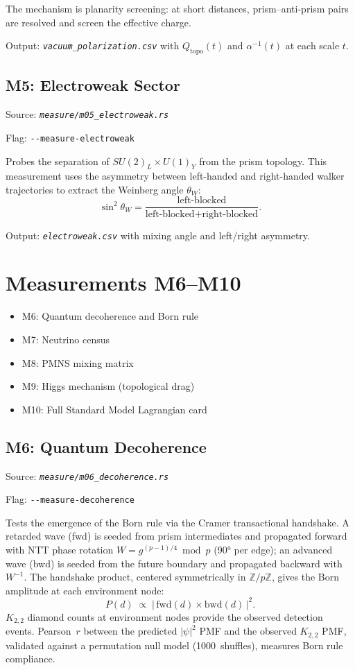 \documentclass[11pt, a4paper, openany]{book}
\newcommand{\flag}[1]{\texttt{-{}-#1}}
\newcommand{\file}[1]{\texttt{\itshape #1}}
\newenvironment{introduction}[1][Chapter Overview]{%
  \begin{tcolorbox}[
    enhanced,colback=structure!5,colframe=structure,
    colbacktitle=structure,coltitle=white,
    fonttitle=\small\bfseries,title={#1},
    arc=2pt,boxrule=0.7pt,
    left=8pt,right=8pt,top=6pt,bottom=6pt,
    before skip=12pt,after skip=12pt
  ]\itshape\begin{itemize}[leftmargin=*,itemsep=2pt,parsep=0pt]
}{%
  \end{itemize}\end{tcolorbox}
}
\begin{document}
The mechanism is planarity screening: at short distances, prism--anti-prism pairs
are resolved and screen the effective charge.

Output: \file{vacuum\_polarization.csv} with $Q_{\text{topo}}(t)$ and
$\alpha^{-1}(t)$ at each scale $t$.

\section{M5: Electroweak Sector}

Source: \file{measure/m05\_electroweak.rs}

Flag: \flag{measure-electroweak}

Probes the separation of $SU(2)_L \times U(1)_Y$ from the prism topology.
This measurement uses the asymmetry between left-handed and right-handed walker
trajectories to extract the Weinberg angle $\theta_W$:
\[
  \sin^2\theta_W = \frac{\text{left-blocked}}{\text{left-blocked} +
  \text{right-blocked}}.
\]

Output: \file{electroweak.csv} with mixing angle and left/right asymmetry.


\chapter{Measurements M6--M10}

\begin{introduction}
  \item M6: Quantum decoherence and Born rule
  \item M7: Neutrino census
  \item M8: PMNS mixing matrix
  \item M9: Higgs mechanism (topological drag)
  \item M10: Full Standard Model Lagrangian card
\end{introduction}

\section{M6: Quantum Decoherence}

Source: \file{measure/m06\_decoherence.rs}

Flag: \flag{measure-decoherence}

Tests the emergence of the Born rule via the Cramer transactional handshake.
A retarded wave (fwd) is seeded from prism intermediates and propagated forward
with NTT phase rotation $W = g^{(p-1)/4} \bmod p$ (90° per edge); an advanced
wave (bwd) is seeded from the future boundary and propagated backward with
$W^{-1}$.  The handshake product, centered symmetrically in $\mathbb{Z}/p\mathbb{Z}$,
gives the Born amplitude at each environment node:
\[
  P(d) \;\propto\; \bigl|\,\text{fwd}(d) \times \text{bwd}(d)\,\bigr|^2.
\]
$K_{2,2}$ diamond counts at environment nodes provide the observed detection
events.  Pearson~$r$ between the predicted $|\psi|^2$ PMF and the observed
$K_{2,2}$ PMF, validated against a permutation null model (1000~shuffles),
measures Born rule compliance.
\end{document}
